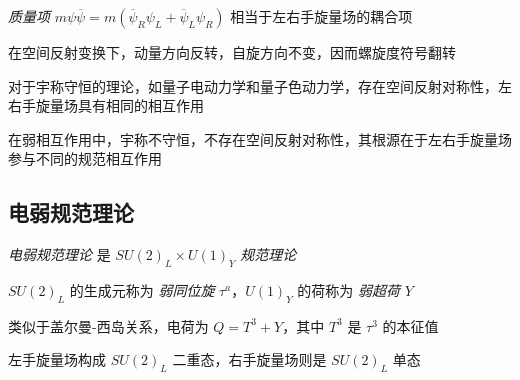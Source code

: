 \emph{质量项} $m\psi\overline{\psi}=m(\overline{\psi}_R \psi_L+\overline{\psi}_L \psi_R)$ 相当于左右手旋量场的耦合项

在空间反射变换下，动量方向反转，自旋方向不变，因而螺旋度符号翻转

对于宇称守恒的理论，如量子电动力学和量子色动力学，存在空间反射对称性，左右手旋量场具有相同的相互作用

在弱相互作用中，宇称不守恒，不存在空间反射对称性，其根源在于左右手旋量场参与不同的规范相互作用

\subsection{电弱规范理论}

\emph{电弱规范理论} 是 $SU(2)_L \times U(1)_Y$ \emph{规范理论}

$SU(2)_L$ 的生成元称为 \emph{弱同位旋} $\tau^a$，$U(1)_Y$ 的荷称为 \emph{弱超荷} $Y$

类似于盖尔曼-西岛关系，电荷为 $Q=T^3+Y$，其中 $T^3$ 是 $\tau^3$ 的本征值

左手旋量场构成 $SU(2)_L$ 二重态，右手旋量场则是 $SU(2)_L$ 单态


